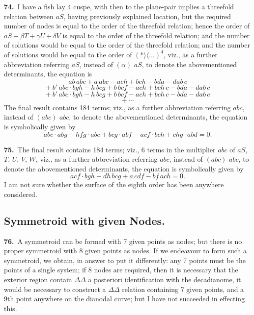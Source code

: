 \documentclass[11pt,a4paper]{article}
\newcommand{\bw}{\mathrel{\rangle\!\langle}}
\begin{document}
\medskip

\textbf{74.}\ I have a fish lay 4 cuspe, with then to the plane-pair implies a threefold relation between $aS$, having previously explained location, but the required number of nodes is equal to the order of the threefold relation; hence the order of $aS + \beta T + \gamma U + \delta V$ is equal to the order of the threefold relation; and the number of solutions would be equal to the order of the threefold relation; and the number of solutions would be equal to the order of $(\ast \bw\ldots)^4$, viz., as a further abbreviation referring $aS$, instead of $(\alpha)$ $aS$, to denote the abovementioned determinants, the equation is
\[
ab\,abc + a\,abc - ach + bch - bda - dab\,c
\]
\[
+\ b'\,abc\cdot bgh - h\,bcg + b\,bcf - ach + bch\,c - bda - dab\,c
\]
\[
+\ b'\,abc\cdot bgh - h\,bcg + b\,bcf - ach + bch\,c - bda - dab\,c
\]
\[
+\ \cdots
\]
The final result contains 184 terms; viz., as a further abbreviation referring $abc$, instead of $(abc)$ $abc$, to denote the abovementioned determinants, the equation is symbolically given by
\[
abc \cdot abg - hfg \cdot abc + bcg \cdot abf - acf \cdot bch + chg \cdot abd = 0.
\]

\medskip

\textbf{75.}\ The final result contains 184 terms; viz., 6 terms in the multiplier $abc$ of $aS$, $T$, $U$, $V$, $W$, viz., as a further abbreviation referring $abc$, instead of $(abc)$ $abc$, to denote the abovementioned determinants, the equation is symbolically given by
\[
acf \cdot bgh - dh\,bcg + a\,cdf - bf\,ach = 0.
\]
I am not sure whether the surface of the eighth order has been anywhere considered.

\newpage
\setcounter{page}{162}

\subsection*{Symmetroid with given Nodes.}

\noindent\textbf{76.}\ A symmetroid can be formed with 7 given points as nodes; but there is no proper symmetroid with 8 given points as nodes. If we endeavour to form such a symmetroid, we obtain, in answer to put it differently: any 7 points must be the points of a single system; if 8 nodes are required, then it is necessary that the exterior region contain $\Delta\Delta$ a posteriori identification with the decadianome, it would be necessary to construct a $\Delta\Delta$ relation containing 7 given points, and a 9th point anywhere on the dianodal curve; but I have not succeeded in effecting this.
\end{document}
